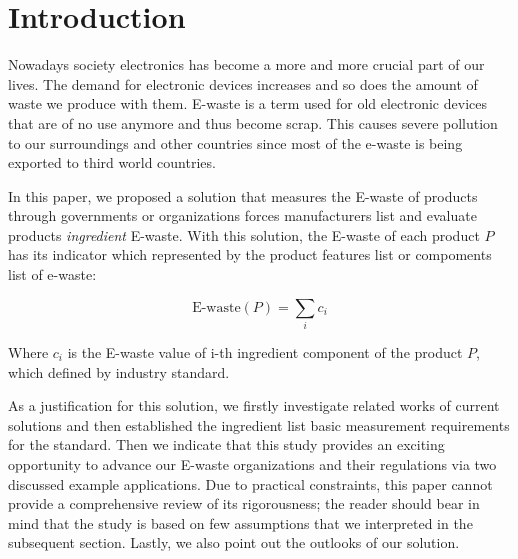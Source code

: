 \section{Introduction}

Nowadays society electronics has become a more and more crucial part of our lives. 
The demand for electronic devices increases and so does the amount of waste we produce with them. 
E-waste is a term used for old electronic devices that are of no use anymore and thus become scrap. 
This causes severe pollution to our surroundings and other countries since most of the e-waste 
is being exported to third world countries.

In this paper, we proposed a solution that measures the E-waste of products through governments 
or organizations forces manufacturers list and evaluate products \emph{ingredient} E-waste.
With this solution, the E-waste of each product $P$ has its indicator which represented by 
the product features list or compoments list of e-waste:

\[
\text{E-waste}(P) = \sum_{i}{c_{i}}
\]

Where $c_{i}$ is the E-waste value of i-th ingredient component of the product $P$, 
which defined by industry standard. 

As a justification for this solution, we firstly 
investigate related works of current solutions and then established the ingredient list 
basic measurement requirements for the standard. Then we indicate that this study provides 
an exciting opportunity to advance our E-waste organizations and their regulations via 
two discussed example applications.
Due to practical constraints, this paper cannot provide a comprehensive review of its 
rigorousness; the reader should bear in mind that the study is based on few assumptions that 
we interpreted in the subsequent section. Lastly, we also point out the outlooks of our solution.